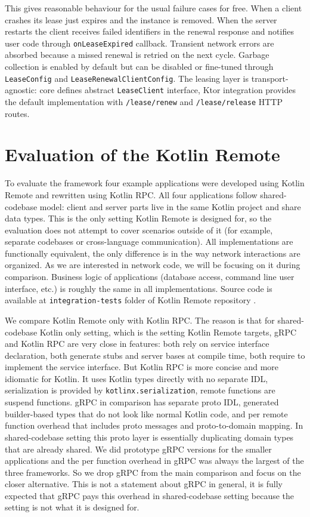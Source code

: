 \documentclass[a4paper,11pt,oneside]{article}
\newcommand{\kotlini}[1]{\texttt{#1}}
\newcommand{\ki}[1]{\kotlini{#1}}
\begin{document}
This gives reasonable behaviour for the usual failure cases for free. When a client crashes its
lease just expires and the instance is removed. When the server restarts the client receives
failed identifiers in the renewal response and notifies user code through \ki{onLeaseExpired}
callback. Transient network errors are absorbed because a missed renewal is retried on the next
cycle. Garbage collection is enabled by default but can be disabled or fine-tuned through
\ki{LeaseConfig} and \ki{LeaseRenewalClientConfig}. The leasing layer is transport-agnostic: core
defines abstract \ki{LeaseClient} interface, Ktor integration provides the default implementation
with \ki{/lease/renew} and \ki{/lease/release} HTTP routes.

\section{Evaluation of the Kotlin Remote}

To evaluate the framework four example applications were developed using Kotlin Remote and
rewritten using Kotlin RPC. All four applications follow shared-codebase model: client and server
parts live in the same Kotlin project and share data types. This is the only setting Kotlin Remote
is designed for, so the evaluation does not attempt to cover scenarios outside of it (for example,
separate codebases or cross-language communication). All implementations are functionally equivalent,
the only difference is in the way network interactions are organized. As we are interested in
network code, we will be focusing on it during comparison. Business logic of applications (database
access, command line user interface, etc.) is roughly the same in all implementations. Source code
is available at \texttt{integration-tests} folder of Kotlin Remote repository \cite{enotvtapke_kotlin-remote_2026}.

We compare Kotlin Remote only with Kotlin RPC. The reason is that for shared-codebase Kotlin only
setting, which is the setting Kotlin Remote targets, gRPC and Kotlin RPC are very close in
features: both rely on service interface declaration, both generate stubs and server bases at
compile time, both require to implement the service interface. But Kotlin RPC is more concise
and more idiomatic for Kotlin. It uses Kotlin types directly with no separate IDL, serialization
is provided by \texttt{kotlinx.serialization}, remote functions are suspend functions. gRPC in
comparison has separate proto IDL, generated builder-based types that do not look like normal
Kotlin code, and per remote function overhead that includes proto messages and proto-to-domain
mapping. In shared-codebase setting this proto layer is essentially duplicating domain types that
are already shared. We did prototype gRPC versions for the smaller applications and the per
function overhead in gRPC was always the largest of the three frameworks. So we drop gRPC from
the main comparison and focus on the closer alternative. This is not a statement about gRPC in
general, it is fully expected that gRPC pays this overhead in shared-codebase setting because the
setting is not what it is designed for.
\end{document}
